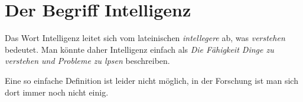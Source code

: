 \chapter{Der Begriff Intelligenz}

Das Wort Intelligenz leitet sich vom lateinischen \emph{intellegere} ab, was
\emph{verstehen} bedeutet. Man könnte daher Intelligenz einfach als
\emph{Die Fähigkeit Dinge zu verstehen und Probleme zu lpsen} beschreiben.

Eine so einfache Definition ist leider nicht möglich, in der Forschung ist man
sich dort immer noch nicht einig.
